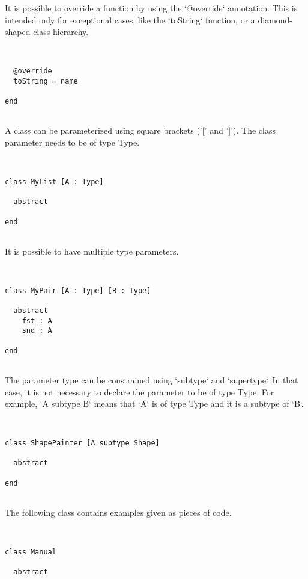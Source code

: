\documentclass[12pt,a4paper]{article}
\begin{document}
It is possible to override a function by using the `@override` annotation.
This is intended only for exceptional cases, like the `toString` function, or a
diamond-shaped class hierarchy.


\begin{lstlisting}


  @override
  toString = name

end


\end{lstlisting}

A class can be parameterized using square brackets ('[' and ']').
The class parameter needs to be of type Type.


\begin{lstlisting}


class MyList [A : Type]

  abstract

end


\end{lstlisting}

It is possible to have multiple type parameters.


\begin{lstlisting}


class MyPair [A : Type] [B : Type]

  abstract
    fst : A
    snd : A

end


\end{lstlisting}

The parameter type can be constrained using `subtype` and `supertype`.
In that case, it is not necessary to declare the parameter to be of type Type.
For example, `A subtype B` means that `A` is of type Type and it is a subtype of `B`.


\begin{lstlisting}


class ShapePainter [A subtype Shape]

  abstract

end


\end{lstlisting}

The following class contains examples given as pieces of code.


\begin{lstlisting}


class Manual

  abstract


\end{lstlisting}
\end{document}
